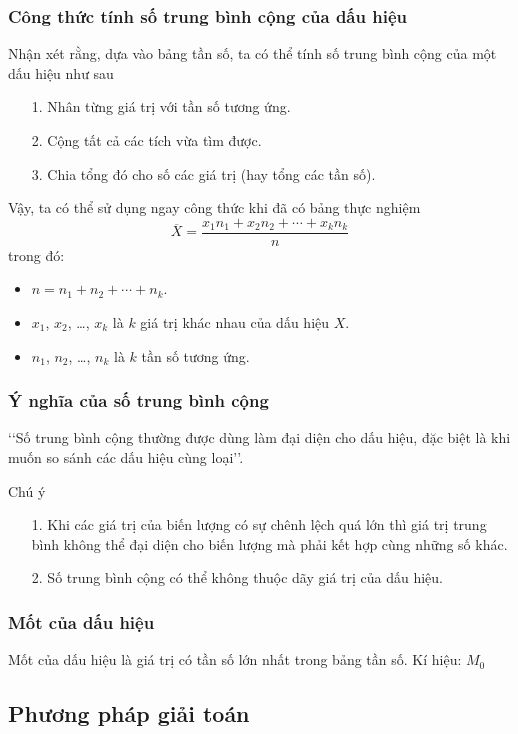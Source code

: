 \subsubsection{Công thức tính số trung bình cộng của dấu hiệu}
Nhận xét rằng, dựa vào bảng tần số, ta có thể tính số trung bình cộng của một dấu hiệu như sau
\begin{enumerate}
\item[1.] Nhân từng giá trị với tần số tương ứng.
\item[2.] Cộng tất cả các tích vừa tìm được.
\item[3.] Chia tổng đó cho số các giá trị (hay tổng các tần số).
\end{enumerate}
Vậy, ta có thể sử dụng ngay công thức khi đã có bảng thực nghiệm
$$\overline{X}= \dfrac{x_1n_1 + x_2n_2 + \cdots + x_kn_k}{n}$$
trong đó:
\begin{itemize}
\item $n=n_1 + n_2 + \cdots + n_k$.
\item $x_1$, $x_2$, \ldots, $x_k$ là $k$ giá trị khác nhau của dấu hiệu $X$.
\item $n_1$, $n_2$, \ldots, $n_k$ là $k$ tần số tương ứng.
\end{itemize}
\subsubsection{Ý nghĩa của số trung bình cộng}
\lq\lq Số trung bình cộng thường được dùng làm đại diện cho dấu hiệu, đặc biệt là khi muốn so sánh các dấu hiệu cùng loại\rq\rq.
\begin{note}{Chú ý}
	\begin{itemize}
		\item[1.] Khi các giá trị của biến lượng có sự chênh lệch quá lớn thì giá trị trung bình không thể đại diện cho biến lượng mà phải kết hợp cùng những số khác.
		\item[2.] Số trung bình cộng có thể không thuộc dãy giá trị của dấu hiệu.
	\end{itemize}
\end{note}

\subsubsection{Mốt của dấu hiệu}
\begin{dn}
Mốt của dấu hiệu là giá trị có tần số lớn nhất trong bảng tần số. Kí hiệu: $M_0$
\end{dn}
\subsection{Phương pháp giải toán}

